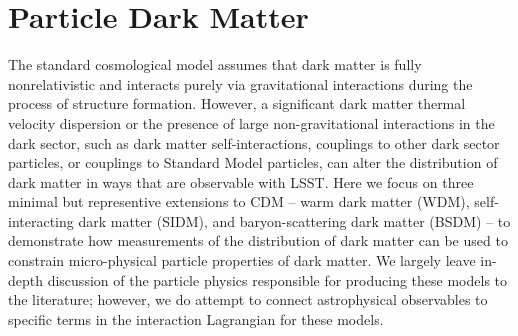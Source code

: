 \section{Particle Dark Matter }
\label{sec:particles}


The standard \LCDM cosmological model assumes that dark matter is fully nonrelativistic and interacts purely via gravitational interactions during the process of structure formation. However, a significant dark matter thermal velocity dispersion or the presence of large non-gravitational interactions in the dark sector, such as dark matter self-interactions, couplings to other dark sector particles, or couplings to Standard Model particles, can alter the distribution of dark matter in ways that are observable with LSST. Here we focus on three minimal but representive extensions to CDM -- warm dark matter (WDM), self-interacting dark matter (SIDM), and baryon-scattering dark matter (BSDM) --  to demonstrate how measurements of the distribution of dark matter can be used to constrain micro-physical particle properties of dark matter. We largely leave in-depth discussion of the particle physics responsible for producing these models to the literature; however, we do attempt to connect astrophysical observables to specific terms in the interaction Lagrangian for these models.




